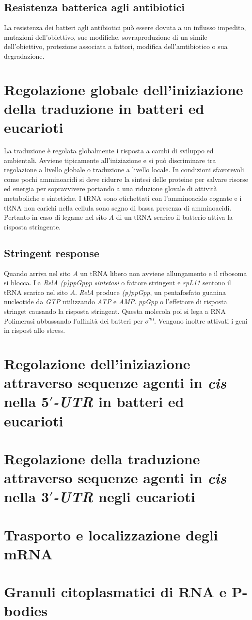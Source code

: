 \subsection{Resistenza batterica agli antibiotici}
La resistenza dei batteri agli antibiotici pu\`o essere dovuta a un influsso impedito, mutazioni dell'obiettivo, sue modifiche, sovraproduzione di un simile dell'obiettivo, protezione
associata a fattori, modifica dell'amtibiotico o sua degradazione. 
\section{Regolazione globale dell'iniziazione della traduzione in batteri ed eucarioti}
La traduzione \`e regolata globalmente i risposta a cambi di sviluppo ed ambientali. Avviene tipicamente all'iniziazione e si pu\`o discriminare tra regolazione a livello globale o 
traduzione a livello locale. In condizioni sfavorevoli come pochi amminoacidi si deve ridurre la sintesi delle proteine per salvare risorse ed energia per sopravvivere portando
a una riduzione glovale di attivit\`a metaboliche e sintetiche. I tRNA sono etichettati con l'amminoacido cognate e i tRNA non carichi nella cellula sono segno di bassa presenza di 
amminoacidi. Pertanto in caso di legame nel sito $A$ di un tRNA scarico il batterio attiva la risposta stringente. 
\subsection{Stringent response}
Quando arriva nel sito $A$ un tRNA libero non avviene allungamento e il ribosoma si blocca. La \emph{RelA (p)ppGppp sintetasi} o fattore stringent e \emph{rpL11} sentono il 
tRNA scarico nel sito $A$. \emph{RelA} produce \emph{(p)ppGpp}, un pentafosfato guanina nucleotide da \emph{GTP} utilizzando \emph{ATP} e \emph{AMP}. \emph{ppGpp} o l'effettore di 
risposta stringet causando la risposta stringent. Questa molecola poi si lega a RNA Polimerasi abbassando l'affinit\`a dei batteri per $\sigma^{70}$. Vengono inoltre attivati i 
geni in rispost allo stress. 

\section{Regolazione dell'iniziazione attraverso sequenze agenti in \emph{cis} nella \emph{$\mathbf{5'}$-UTR} in batteri ed eucarioti}

\section{Regolazione della traduzione attraverso sequenze agenti in \emph{cis} nella \emph{$\mathbf{3'}$-UTR} negli eucarioti}

\section{Trasporto e localizzazione degli mRNA}

\section{Granuli citoplasmatici di RNA e P-bodies}
